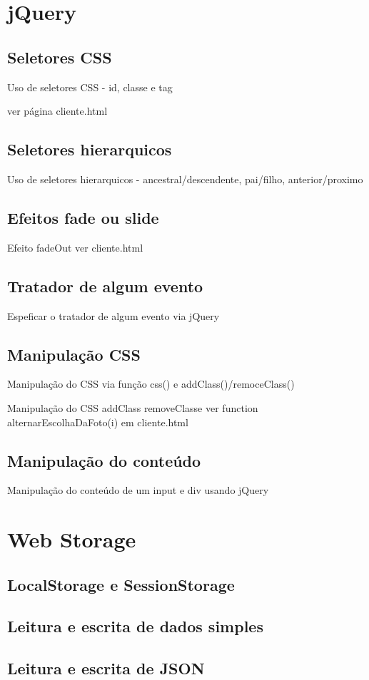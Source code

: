 \section{jQuery}
\subsection{Seletores CSS}
Uso de seletores CSS - id, classe e tag
	
	ver página cliente.html


\subsection{Seletores hierarquicos}
Uso de seletores hierarquicos - ancestral/descendente, pai/filho, anterior/proximo
\subsection{Efeitos fade ou slide}

Efeito fadeOut ver cliente.html


\subsection{Tratador de algum evento}
Espeficar o tratador de algum evento via jQuery
\subsection{Manipulação CSS}
Manipulação do CSS via função css() e addClass()/remoceClass()

Manipulação do CSS addClass removeClasse ver function alternarEscolhaDaFoto(i) em cliente.html


\subsection{Manipulação do conteúdo}
Manipulação do conteúdo de um input e div usando jQuery

\section{Web Storage }
\subsection{LocalStorage e SessionStorage}
\subsection{Leitura e escrita de dados simples}
\subsection{Leitura e escrita de JSON}
